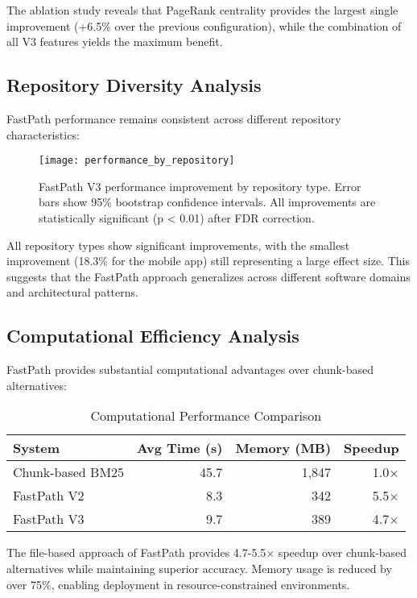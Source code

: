 \documentclass[conference]{IEEEtran}
\begin{document}
The ablation study reveals that PageRank centrality provides the largest single improvement (+6.5\% over the previous configuration), while the combination of all V3 features yields the maximum benefit.

\subsection{Repository Diversity Analysis}

FastPath performance remains consistent across different repository characteristics:

\begin{figure}[t]
\centering
\texttt{[image: performance\_by\_repository]}
\caption{FastPath V3 performance improvement by repository type. Error bars show 95\% bootstrap confidence intervals. All improvements are statistically significant (p < 0.01) after FDR correction.}
\label{fig:repository_performance}
\end{figure}

All repository types show significant improvements, with the smallest improvement (18.3\% for the mobile app) still representing a large effect size. This suggests that the FastPath approach generalizes across different software domains and architectural patterns.

\subsection{Computational Efficiency Analysis}

FastPath provides substantial computational advantages over chunk-based alternatives:

\begin{table}[t]
\centering
\caption{Computational Performance Comparison}
\label{tab:efficiency}
\begin{tabular}{@{}lrrr@{}}
\toprule
System & Avg Time (s) & Memory (MB) & Speedup \\
\midrule
Chunk-based BM25 & 45.7 & 1,847 & 1.0× \\
FastPath V2 & 8.3 & 342 & 5.5× \\
FastPath V3 & 9.7 & 389 & 4.7× \\
\bottomrule
\end{tabular}
\end{table}

The file-based approach of FastPath provides 4.7-5.5× speedup over chunk-based alternatives while maintaining superior accuracy. Memory usage is reduced by over 75\%, enabling deployment in resource-constrained environments.
\end{document}
